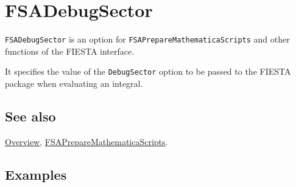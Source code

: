 \documentclass[../FeynHelpersManual.tex]{subfiles}
\begin{document}
\begin{Shaded}
\begin{Highlighting}[]
 
\end{Highlighting}
\end{Shaded}

\hypertarget{fsadebugsector}{
\section{FSADebugSector}\label{fsadebugsector}}

\texttt{FSADebugSector} is an option for
\texttt{FSAPrepareMathematicaScripts} and other functions of the FIESTA
interface.

It specifies the value of the \texttt{DebugSector} option to be passed
to the FIESTA package when evaluating an integral.

\subsection{See also}

\hyperlink{toc}{Overview},
\hyperlink{fsapreparemathematicascripts}{FSAPrepareMathematicaScripts}.

\subsection{Examples}
\end{document}
